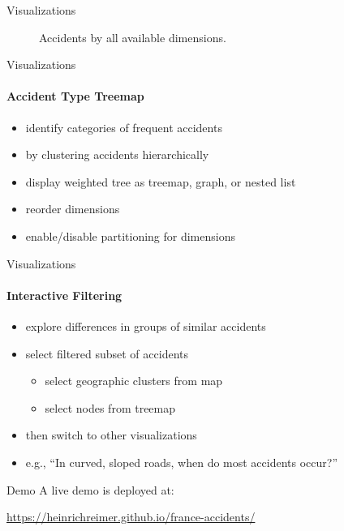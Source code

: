 \documentclass[english]{mlutalk}
\begin{document}
\begin{frame}{Visualizations}
\begin{minipage}{0.49\linewidth}
\begin{figure}
      \caption{Accidents by all available dimensions.}
    \end{figure}
  \end{minipage}
\end{frame}

\begin{frame}{Visualizations}
  \framesubtitle{Accident Type Treemap}
  \begin{itemize}
    \setlength{\itemsep}{3ex}
    \item identify categories of frequent accidents
    \item by clustering accidents hierarchically
    \item display weighted tree as treemap, graph, or nested list
    \item reorder dimensions
    \item enable/disable partitioning for dimensions
  \end{itemize}
\end{frame}

\begin{frame}{Visualizations}
  \framesubtitle{Interactive Filtering}
  \begin{itemize}
    \setlength{\itemsep}{3ex}
    \item explore differences in groups of similar accidents
    \item select filtered subset of accidents
    \begin{itemize}
      \item select geographic clusters from map
      \item select nodes from treemap
    \end{itemize}
    \item then switch to other visualizations
    \item e.g., \enquote{In curved, sloped roads, when do most accidents occur?}
  \end{itemize}
\end{frame}

\begin{frame}{Demo}
  \centering
  A live demo is deployed at:
  \vspace{2ex}
  \par
  \enskip
  \footnotesize
  \url{https://heinrichreimer.github.io/france-accidents/}
\end{frame}
\end{document}
